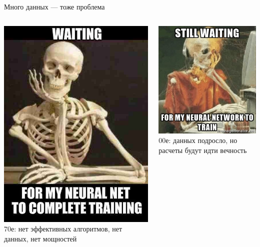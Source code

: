 \documentclass[aspectratio=169, professionalfonts]{beamer}
\begin{document}
\begin{frame}{Много данных --- тоже проблема}
    \begin{columns}
        \begin{column}{.49\linewidth}
            \centering
            \includegraphics[width=.55\linewidth]{figures/fig52-waiting.jpg} \\
            70е: нет эффективных алгоритмов, нет данных, нет мощностей
        \end{column}
        \begin{column}{.49\linewidth}
            \centering
            \includegraphics[width=.7\linewidth]{figures/fig53-waiting.jpg} \\
            00е: данных подросло, но расчеты будут идти вечность
        \end{column}
    \end{columns}
\end{frame}
\end{document}
